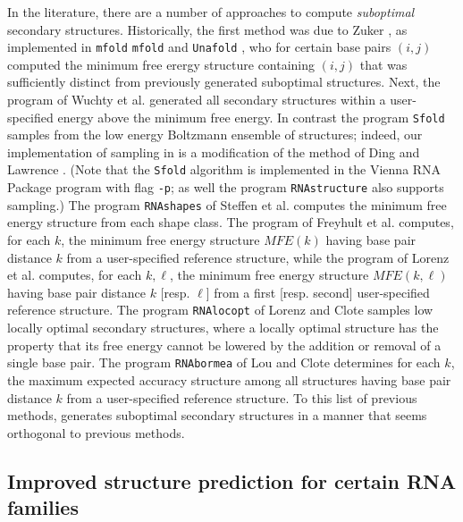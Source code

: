 In the literature, there are a number of approaches to compute
{\em suboptimal} secondary structures. Historically, the first
method was due to Zuker \citep{Zuk89a}, as implemented in {\tt mfold}
{\tt mfold} \citep{Zuk89a} and {\tt Unafold} \citep{Markham.mmb08},
who for certain base pairs $(i,j)$ computed the minimum
free erergy structure containing $(i,j)$ that was sufficiently distinct
from previously generated suboptimal structures.
Next, the program \rnasub of Wuchty et al.
\citep{wuchtyFontanaHofackerSchuster} generated all secondary structures
within a user-specified energy above the minimum free energy.
In contrast the program {\tt Sfold} \citep{Ding.nar03} samples from
the low energy Boltzmann ensemble of structures; indeed, our implementation
of sampling in {\rnahairpin} is a modification of the method of
Ding and Lawrence \citep{Ding.nar03}. (Note that the {\tt Sfold} algorithm
is implemented in the Vienna RNA Package program
\rnasub with flag {\tt -p}; as well the program
{\tt RNAstructure} \citep{mathewsConstraints} also supports sampling.)
The program {\tt RNAshapes} of Steffen et al.
\citep{giegerich:shapesBioinf} computes the minimum free energy structure
from each shape class.
The program \rnabor of Freyhult et al. \citep{freyhult.b07}
computes, for each $k$,
the minimum free energy structure $MFE(k)$ having base pair
distance $k$ from a user-specified reference structure, while the
program \rnatwofold of Lorenz et al. \citep{hofacker:RNAbor2D}
computes, for each $k,\ell$, the minimum free energy structure
$MFE(k,\ell)$ having base pair
distance $k$ [resp. $\ell$] from a first [resp. second]
user-specified reference structure.
The program {\tt RNAlocopt} of Lorenz and Clote  \citep{RNAlocopt}
samples low  locally optimal secondary structures, where a locally
optimal structure has the property that its free energy cannot be lowered
by the addition or removal of a single base pair. The program
{\tt RNAbormea} of Lou and Clote \citep{Clote.bb12} determines
for each $k$, the maximum expected accuracy structure among all structures
having base pair distance $k$ from a user-specified reference structure.
To this list of previous methods, {\rnahairpin} generates suboptimal
secondary structures in a manner that seems orthogonal to previous methods.

\subsection{Improved structure prediction for certain RNA families}



